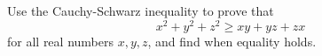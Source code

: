Use the Cauchy-Schwarz inequality to prove that
\[x^2+y^2+z^2\ge xy+yz+zx\]
for all real numbers $x,y,z$, and find when equality holds.
